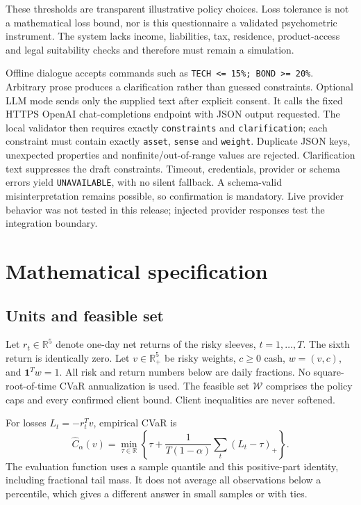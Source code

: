 \documentclass[11pt,a4paper]{article}
\begin{document}
These thresholds are transparent illustrative policy choices. Loss tolerance is not a mathematical loss bound, nor is this questionnaire a validated psychometric instrument. The system lacks income, liabilities, tax, residence, product-access and legal suitability checks and therefore must remain a simulation.

Offline dialogue accepts commands such as \texttt{TECH <= 15\%; BOND >= 20\%}. Arbitrary prose produces a clarification rather than guessed constraints. Optional LLM mode sends only the supplied text after explicit consent. It calls the fixed HTTPS OpenAI chat-completions endpoint with JSON output requested. The local validator then requires exactly \texttt{constraints} and \texttt{clarification}; each constraint must contain exactly \texttt{asset}, \texttt{sense} and \texttt{weight}. Duplicate JSON keys, unexpected properties and nonfinite/out-of-range values are rejected. Clarification text suppresses the draft constraints. Timeout, credentials, provider or schema errors yield \texttt{UNAVAILABLE}, with no silent fallback. A schema-valid misinterpretation remains possible, so confirmation is mandatory. Live provider behavior was not tested in this release; injected provider responses test the integration boundary.

\section{Mathematical specification}
\subsection{Units and feasible set}
Let $r_t\in\mathbb R^5$ denote one-day net returns of the risky sleeves, $t=1,\ldots,T$. The sixth return is identically zero. Let $v\in\mathbb R_+^5$ be risky weights, $c\geq0$ cash, $w=(v,c)$, and $\mathbf1^Tw=1$. All risk and return numbers below are daily fractions. No square-root-of-time CVaR annualization is used. The feasible set $\mathcal W$ comprises the policy caps and every confirmed client bound. Client inequalities are never softened.

For losses $L_t=-r_t^Tv$, empirical CVaR is
\[
 \widehat C_\alpha(v)=\min_{\tau\in\mathbb R}\left\{\tau+
 \frac1{T(1-\alpha)}\sum_t(L_t-\tau)_+\right\}.
\]
The evaluation function uses a sample quantile and this positive-part identity, including fractional tail mass. It does not average all observations below a percentile, which gives a different answer in small samples or with ties.
\end{document}
